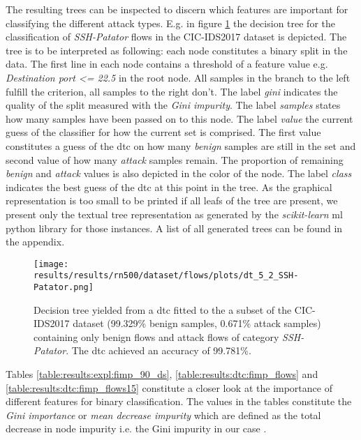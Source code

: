 The resulting trees can be inspected to discern which features are important for classifying the different attack types. E.g. in figure \ref{fig:results:dtc:cic2017:ssh_patator} the decision tree for the classification of \textit{SSH-Patator} flows in the CIC-IDS2017 dataset is depicted. The tree is to be interpreted as following: each node constitutes a binary split in the data. The first line in each node contains a threshold of a feature value e.g. \textit{Destination port <= 22.5} in the root node. All samples in the branch to the left fulfill the criterion, all samples to the right don't. The label \textit{gini} indicates the quality of the split measured with the \textit{Gini impurity}. The label \textit{samples} states how many samples have been passed on to this node. The label \textit{value} the current guess of the classifier for how the current set is comprised. The first value constitutes a guess of the \gls{dtc} on how many \textit{benign} samples are still in the set and second value of how many \textit{attack} samples remain. The proportion of remaining \textit{benign} and \textit{attack} values is also depicted in the color of the node. The label \textit{class} indicates the best guess of the \gls{dtc} at this point in the tree. As the graphical representation is too small to be printed if all leafs of the tree are present, we present only the textual tree representation as generated by the \textit{scikit-learn} \gls{ml} python library \cite{sklearn} for those instances. A list of all generated trees can be found in the appendix. \par

\begin{figure}[]
	\centering
	\texttt{[image: results/results/rn500/dataset/flows/plots/dt\_5\_2\_SSH-Patator.png]}
	\caption{Decision tree yielded from a \gls{dtc} fitted to the a subset of the CIC-IDS2017 dataset (99.329\% benign samples, 0.671\% attack samples) containing only benign flows and attack flows of category \textit{SSH-Patator}. The \gls{dtc} achieved an accuracy of 99.781\%.}
	\label{fig:results:dtc:cic2017:ssh_patator}
\end{figure}

Tables \ref{table:results:expl:fimp_90_ds}, \ref{table:results:dtc:fimp_flows} and \ref{table:results:dtc:fimp_flows15} constitute a closer look at the importance of different features for binary classification. The values in the tables constitute the \textit{Gini importance} or \textit{mean decrease impurity} which are defined as the total decrease in node impurity i.e. the Gini impurity in our case \cite{sklearn}. \par


